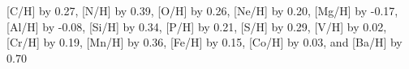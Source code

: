 [C/H] by 0.27, [N/H] by 0.39, [O/H] by 0.26, [Ne/H] by 0.20, [Mg/H] by -0.17, [Al/H] by -0.08, [Si/H] by 0.34, [P/H] by 0.21, [S/H] by 0.29, [V/H] by 0.02, [Cr/H] by 0.19, [Mn/H] by 0.36, [Fe/H] by 0.15, [Co/H] by 0.03,  and [Ba/H] by 0.70%
